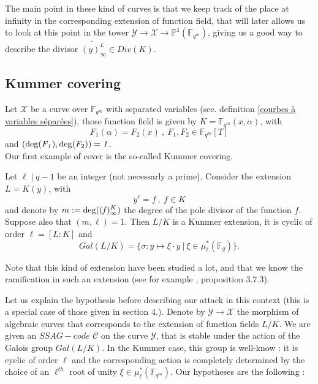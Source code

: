 \documentclass[10pt]{article}
\newcommand{\s}{\vspace{0.3cm}}
\newcommand{\cd}{\cdot}
\newcommand{\fqm}{\mathbb{F}_{q^m}}
\newcommand{\fq}{\mathbb{F}_q}
\newcommand{\X}{\mathcal{X}}
\newcommand{\Y}{\mathcal{Y}}
\begin{document}
\s

The main point in these kind of curves is that we keep track of the place at infinity in the corresponding extension of function field, that will later allows us to look at this point in the tower $\Y \rightarrow \X \rightarrow \mathbb{P}^1(\fqm)$, giving us a good way to describe the divisor $\widetilde{(y)_{\infty}^L} \in Div(K)$.


\s

\subsection{Kummer covering}

\s

Let $\X$ be a curve over $\fqm$ with separated variables (see. definition \ref{courbes à variables séparées}), those function field is given by $K=\fqm(x,\alpha)$, with
\[F_1(\alpha) = F_2(x) \ , \ F_1,F_2 \in \fqm[T] \]
and $(\rm{deg}\it(F_1),\rm{deg}\it(F_{\rm{2}}))=1$.  \\
Our first example of cover is the so-called Kummer covering.

\s

Let $\ell \mid q-1$ be an integer (not necessarly a prime). Consider the extension $L=K(y)$, with
\[y^{\ell} = f \ , \ f \in K\]
and denote by $m:=\rm{deg}\it((f)_{\infty}^K)$ the degree of the pole divisor of the function $f$. Suppose also that $(m,\ell)=1$. Then $L/K$ is a Kummer extension, it is cyclic of order $\ell=[L:K]$ and 
\[Gal(L/K) = \{ \sigma : y \mapsto \xi \cd y \ | \ \xi \in \mu^*_{\ell}(\fq)\}.\] 

\s

Note that this kind of extension have been studied a lot, and that we know the ramification in such an extension (see for example \cite{Sti}, proposition 3.7.3).

Let us explain the hypothesis before describing our attack in this context (this is a special case of those given in section 4.). Denote by $\Y \rightarrow \X$ the morphism of algebraic curves that corresponds to the extension of function fields $L/K$. We are given an $SSAG-code$ $\mathcal{C}$ on the curve $\Y$, that is stable under the action of the Galois group $Gal(L/K)$. In the Kummer case, this group is well-know :  it is cyclic of order $\ell$ and the corresponding action is completely determined by the choice of an $\ell^{th}$ root of unity $\xi \in \mu^*_{\ell}(\fqm)$. Our hypotheses are the following :

\s
\end{document}
